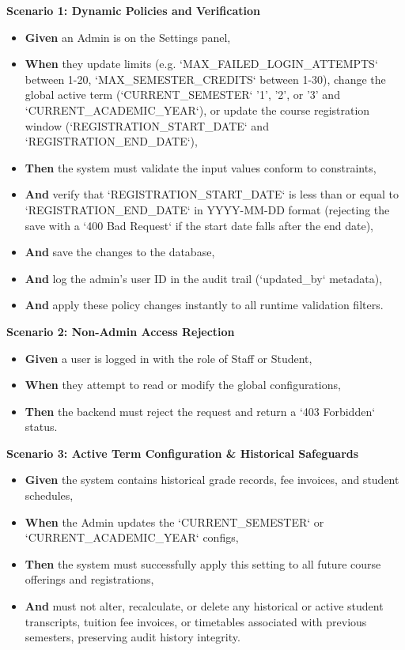 \noindent\textbf{Scenario 1: Dynamic Policies and Verification}\\
\begin{itemize}
  \item \textbf{Given} an Admin is on the Settings panel,
  \item \textbf{When} they update limits (e.g. `MAX\_FAILED\_LOGIN\_ATTEMPTS` between 1-20, `MAX\_SEMESTER\_CREDITS` between 1-30), change the global active term (`CURRENT\_SEMESTER` '1', '2', or '3' and `CURRENT\_ACADEMIC\_YEAR`), or update the course registration window (`REGISTRATION\_START\_DATE` and `REGISTRATION\_END\_DATE`),
  \item \textbf{Then} the system must validate the input values conform to constraints,
  \item \textbf{And} verify that `REGISTRATION\_START\_DATE` is less than or equal to `REGISTRATION\_END\_DATE` in YYYY-MM-DD format (rejecting the save with a `400 Bad Request` if the start date falls after the end date),
  \item \textbf{And} save the changes to the database,
  \item \textbf{And} log the admin's user ID in the audit trail (`updated\_by` metadata),
  \item \textbf{And} apply these policy changes instantly to all runtime validation filters.
\end{itemize}


\noindent\textbf{Scenario 2: Non-Admin Access Rejection}\\
\begin{itemize}
  \item \textbf{Given} a user is logged in with the role of Staff or Student,
  \item \textbf{When} they attempt to read or modify the global configurations,
  \item \textbf{Then} the backend must reject the request and return a `403 Forbidden` status.
\end{itemize}


\noindent\textbf{Scenario 3: Active Term Configuration \& Historical Safeguards}\\
\begin{itemize}
  \item \textbf{Given} the system contains historical grade records, fee invoices, and student schedules,
  \item \textbf{When} the Admin updates the `CURRENT\_SEMESTER` or `CURRENT\_ACADEMIC\_YEAR` configs,
  \item \textbf{Then} the system must successfully apply this setting to all future course offerings and registrations,
  \item \textbf{And} must not alter, recalculate, or delete any historical or active student transcripts, tuition fee invoices, or timetables associated with previous semesters, preserving audit history integrity.
\end{itemize}

